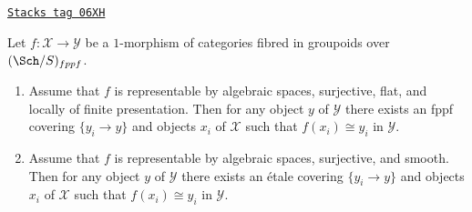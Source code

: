 \begin{lemma}
\label{stacks-sheaves-lemma-surjective-flat-locally-finite-presentation}
\href{https://stacks.math.columbia.edu/tag/06XH}{\texttt{Stacks tag 06XH}}

Let $f : \mathcal{X} \to \mathcal{Y}$ be a $1$-morphism of
categories fibred in groupoids over $(\Sch/S)_{fppf}$.
\begin{enumerate}
\item Assume that $f$ is representable by algebraic spaces, surjective,
flat, and locally of finite presentation. Then for any object $y$ of
$\mathcal{Y}$ there exists an fppf covering $\{y_i \to y\}$ and objects
$x_i$ of $\mathcal{X}$ such that $f(x_i) \cong y_i$ in $\mathcal{Y}$.
\item Assume that $f$ is representable by algebraic spaces, surjective,
and smooth. Then for any object $y$ of
$\mathcal{Y}$ there exists an \'etale covering $\{y_i \to y\}$ and objects
$x_i$ of $\mathcal{X}$ such that $f(x_i) \cong y_i$ in $\mathcal{Y}$.
\end{enumerate}
\end{lemma}

